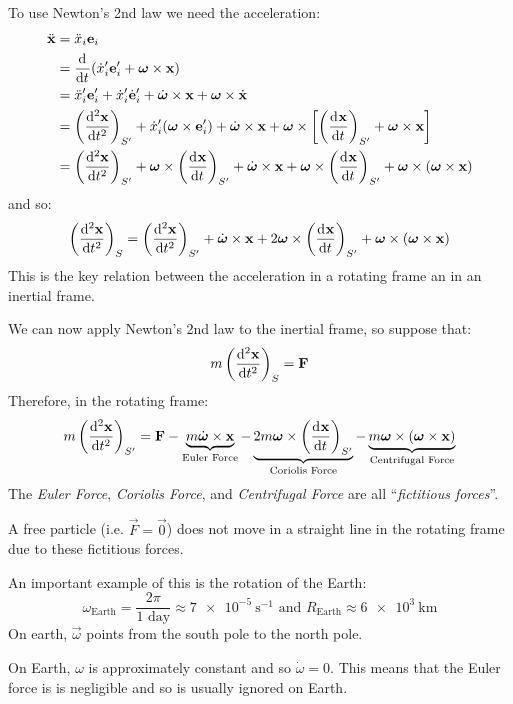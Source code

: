 \documentclass[../main.tex]{subfiles}
\begin{document}
To use Newton's 2nd law we need the acceleration:
\begin{align*}
  \ddot{\vec{x}} &= \ddot{x}_i \vec{e}_i \\
                 &= \deriv{}{t}(\dot{x}_i' \vec{e}_i' + \vec{\omega} \times \vec{x}) \\
                 &= \ddot{x}_i' \vec{e}_i' + \dot{x}_i' \dot{\vec{e}}_i' + \dot{\vec{\omega}} \times \vec{x} + \vec{\omega} \times \dot{\vec{x}} \\
                 &= \left(\deriv[2]{\vec{x}}{t}\right)_{S'} + \dot{x}_i' (\vec{\omega} \times \vec{e}_i') + \dot{\vec{\omega}} \times \vec{x} + \vec{\omega} \times \left[\left(\deriv{\vec{x}}{t}\right)_{S'} + \vec{\omega} \times \vec{x}\right]\\
                 &= \left(\deriv[2]{\vec{x}}{t}\right)_{S'} + \vec{\omega} \times \left(\deriv{\vec{x}}{t}\right)_{S'} + \dot{\vec{\omega}} \times \vec{x} + \vec{\omega} \times \left(\deriv{\vec{x}}{t}\right)_{S'} + \vec{\omega} \times (\vec{\omega} \times \vec{x})
\end{align*}
and so:
\[
  \left(\deriv[2]{\vec{x}}{t}\right)_{S} = \left(\deriv[2]{\vec{x}}{t}\right)_{S'} + \dot{\vec{\omega}} \times \vec{x} + 2 \vec{\omega} \times \left(\deriv{\vec{x}}{t}\right)_{S'} + \vec{\omega} \times (\vec{\omega} \times \vec{x})
\]
This is the key relation between the acceleration in a rotating frame an in an inertial frame.

We can now apply Newton's 2nd law to the inertial frame, so suppose that:
\[
  m \left(\deriv[2]{\vec{x}}{t}\right)_{S} = \vec{F}
\]
Therefore, in the rotating frame:
\[
  m \left(\deriv[2]{\vec{x}}{t}\right)_{S'} = \vec{F} -\underbrace{m \dot{\vec{\omega}} \times \vec{x}}_{\text{Euler Force}} - \underbrace{2 m \vec{\omega} \times \left(\deriv{\vec{x}}{t}\right)_{S'}}_{\text{Coriolis Force}} - \underbrace{m \vec{\omega} \times (\vec{\omega} \times \vec{x})}_{\text{Centrifugal Force}}
\]
The \textit{Euler Force}, \textit{Coriolis Force}, and \textit{Centrifugal Force} are all ``\textit{fictitious forces}''.

A free particle (i.e. $\vec{F} = \vec{0}$) does not move in a straight line in the rotating frame due to these fictitious forces.

An important example of this is the rotation of the Earth:
\[
  \omega_{\text{Earth}} = \frac{2\pi}{\text{1 day}} \approx \qty{7e-5}{\second^{-1}} \text{ and } R_{\text{Earth}} \approx \qty{6e3}{\kilo\metre}
\]
On earth, $\vec{\omega}$ points from the south pole to the north pole.
\begin{remark}
  On Earth, $\omega$ is approximately constant and so $\dot{\omega} = 0$.
  This means that the Euler force is is negligible and so is usually ignored on Earth.
\end{remark}
\end{document}
